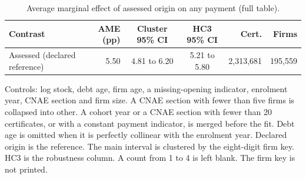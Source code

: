 \begin{table}[H]
\centering
\caption{Average marginal effect of assessed origin on any payment (full table).}\label{tab:app-logit-ame}
\footnotesize
\begin{tabular}{@{}l r cc rr@{}}
\toprule
Contrast & AME (pp) & Cluster 95\% CI & HC3 95\% CI & Cert. & Firms \\
\midrule
Assessed (declared reference) & 5.50 & 4.81 to 6.20 & 5.21 to 5.80 & 2,313,681 & 195,559 \\
\bottomrule
\end{tabular}

\vspace{0.4em}
\begin{minipage}{0.95\textwidth}
\footnotesize
Controls: log stock, debt age, firm age, a missing-opening indicator, enrolment year, CNAE section and firm size. A CNAE section with fewer than five firms is collapsed into other. A cohort year or a CNAE section with fewer than 20 certificates, or with a constant payment indicator, is merged before the fit. Debt age is omitted when it is perfectly collinear with the enrolment year. Declared origin is the reference. The main interval is clustered by the eight-digit firm key. HC3 is the robustness column. A count from 1 to 4 is left blank. The firm key is not printed.
\end{minipage}
\end{table}
